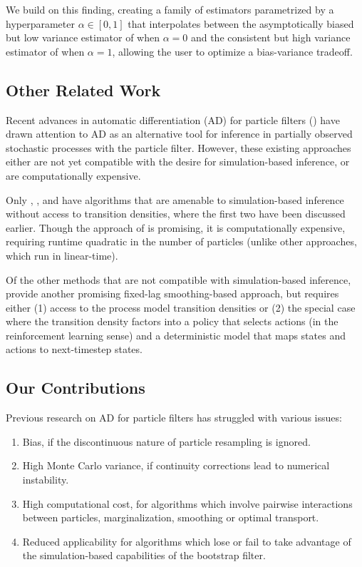 \documentclass{article}
\begin{document}
We build on this finding, creating a family of estimators parametrized by a hyperparameter $\alpha \in [0,1]$ that interpolates between the asymptotically biased but low variance estimator of \cite{blei2018vsmc} when $\alpha=0$ and the consistent but high variance estimator of \cite{poyiadjis11} when $\alpha=1$, allowing the user to optimize a bias-variance tradeoff.

\subsection{Other Related Work}

Recent advances in automatic differentiation (AD) for particle filters (\cite{blei2018vsmc, jon2018diffpf, corenflos21, scibior2021dpf, doucet2022particlebased}) have drawn attention to AD as an alternative tool for inference in partially observed stochastic processes with the particle filter. However, these existing approaches either are not yet compatible with the desire for simulation-based inference, or are computationally expensive. 

Only \cite{scibior21}, \cite{blei2018vsmc}, and \cite{corenflos21} have algorithms that are amenable to simulation-based inference without access to transition densities, where the first two have been discussed earlier. Though the approach of \citet{corenflos21} is promising, it is computationally expensive, requiring runtime quadratic in the number of particles (unlike other approaches, which run in linear-time). 

Of the other methods that are not compatible with simulation-based inference, \citet{doucet2022particlebased} provide another promising fixed-lag smoothing-based approach, but requires either (1) access to the process model transition densities or (2) the special case where the transition density factors into a policy that selects actions (in the reinforcement learning sense) and a deterministic model that maps states and actions to next-timestep states. 



\subsection{Our Contributions}

Previous research on AD for particle filters has struggled with various issues: 
\begin{enumerate}
    \item Bias, if the discontinuous nature of particle resampling is ignored.
    \item High Monte Carlo variance, if continuity corrections lead to numerical instability.
    \item High computational cost, for algorithms which involve pairwise interactions between particles, marginalization, smoothing or optimal transport.
    \item Reduced applicability for algorithms which lose or fail to take advantage of the simulation-based capabilities of the bootstrap filter.
\end{enumerate}
\end{document}
